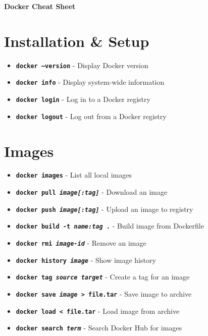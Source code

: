 \documentclass[10pt]{article}
\newcommand{\cmd}[1]{\texttt{#1}}
\newcommand{\dockitem}[2]{\item \textbf{\cmd{#1}} - #2}
\begin{document}
\begin{center}
\huge{\textbf{{Docker Cheat Sheet}}}
\end{center}

\begin{multicols}{2}

\section{Installation \& Setup}
\begin{itemize}[leftmargin=*,noitemsep]
\dockitem{docker --version}{Display Docker version}
\dockitem{docker info}{Display system-wide information}
\dockitem{docker login}{Log in to a Docker registry}
\dockitem{docker logout}{Log out from a Docker registry}
\end{itemize}

\section{Images}
\begin{itemize}[leftmargin=*,noitemsep]
\dockitem{docker images}{List all local images}
\dockitem{docker pull \textit{image[:tag]}}{Download an image}
\dockitem{docker push \textit{image[:tag]}}{Upload an image to registry}
\dockitem{docker build -t \textit{name:tag} .}{Build image from Dockerfile}
\dockitem{docker rmi \textit{image-id}}{Remove an image}
\dockitem{docker history \textit{image}}{Show image history}
\dockitem{docker tag \textit{source target}}{Create a tag for an image}
\dockitem{docker save \textit{image} > file.tar}{Save image to archive}
\dockitem{docker load < file.tar}{Load image from archive}
\dockitem{docker search \textit{term}}{Search Docker Hub for images}
\end{itemize}


\end{multicols}
\end{document}
